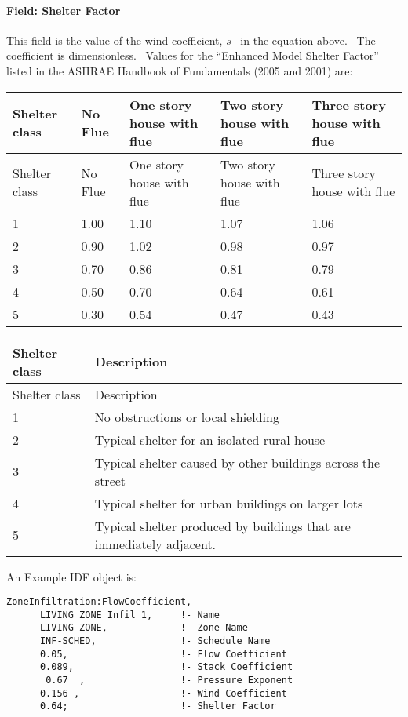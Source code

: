 \paragraph{Field: Shelter Factor}\label{field-shelter-factor}

This field is the value of the wind coefficient, \(s\) ~in the equation above.~ The coefficient is dimensionless.~ Values for the ``Enhanced Model Shelter Factor'' listed in the ASHRAE Handbook of Fundamentals (2005 and 2001) are:

\begin{longtable}[c]{@{}lllll@{}}
\toprule
Shelter class & No Flue & One story house with flue & Two story house with flue & Three story house with flue \tabularnewline
\midrule
\endfirsthead

\toprule
Shelter class & No Flue & One story house with flue & Two story house with flue & Three story house with flue \tabularnewline
\midrule
\endhead

1 & 1.00 & 1.10 & 1.07 & 1.06 \tabularnewline
2 & 0.90 & 1.02 & 0.98 & 0.97 \tabularnewline
3 & 0.70 & 0.86 & 0.81 & 0.79 \tabularnewline
4 & 0.50 & 0.70 & 0.64 & 0.61 \tabularnewline
5 & 0.30 & 0.54 & 0.47 & 0.43 \tabularnewline
\bottomrule
\end{longtable}

\begin{longtable}[c]{p{1.5in}p{4.5in}}
\toprule
Shelter class & Description \tabularnewline
\midrule
\endfirsthead

\toprule
Shelter class & Description \tabularnewline
\midrule
\endhead

1 & No obstructions or local shielding \tabularnewline
2 & Typical shelter for an isolated rural house \tabularnewline
3 & Typical shelter caused by other buildings across the street \tabularnewline
4 & Typical shelter for urban buildings on larger lots \tabularnewline
5 & Typical shelter produced by buildings that are immediately adjacent. \tabularnewline
\bottomrule
\end{longtable}

An Example IDF object is:

\begin{lstlisting}
ZoneInfiltration:FlowCoefficient,
      LIVING ZONE Infil 1,     !- Name
      LIVING ZONE,             !- Zone Name
      INF-SCHED,               !- Schedule Name
      0.05,                    !- Flow Coefficient
      0.089,                   !- Stack Coefficient
       0.67  ,                 !- Pressure Exponent
      0.156 ,                  !- Wind Coefficient
      0.64;                    !- Shelter Factor
\end{lstlisting}

